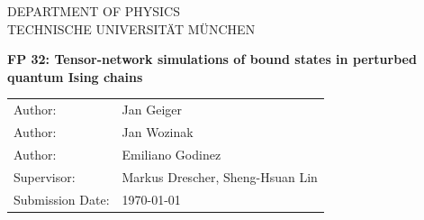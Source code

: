 
\newcommand{\getTitle}{FP 32: Tensor-network simulations of bound states in perturbed quantum Ising chains}
\newcommand{\getAuthor}{Jan Geiger}
\newcommand{\getAuthorI}{Jan Wozinak}
\newcommand{\getAuthorII}{Emiliano Godinez}

\newcommand{\getSupervisor}{Markus Drescher, Sheng-Hsuan Lin}


\begin{titlepage}
    \centering


    \vspace{5mm}
    {\huge\MakeUppercase{Department of Physics}}\\

    \vspace{5mm}
    {\large\MakeUppercase{Technische Universität München}}\\

    \vspace{20mm}

    \vspace{15mm}
    {\huge\bfseries \getTitle{}}

    \vspace{20mm}
    \begin{tabular}{l l}
        Author:          & \getAuthor{} \\
        Author:          & \getAuthorI{} \\
        Author:          & \getAuthorII{} \\
        Supervisor:      & \getSupervisor{} \\
        Submission Date: & \today{} \\
    \end{tabular}

\end{titlepage}
